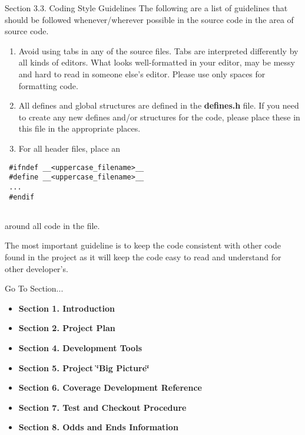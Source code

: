 \begin{Desc}
\item[Section 3.3. Coding Style Guidelines]The following are a list of guidelines that should be followed whenever/wherever possible in the source code in the area of source code.\end{Desc}
\begin{Desc}
\item[]\begin{enumerate}
\item Avoid using tabs in any of the source files. Tabs are interpreted differently by all kinds of editors. What looks well-formatted in your editor, may be messy and hard to read in someone else's editor. Please use only spaces for formatting code.\item All defines and global structures are defined in the {\bf defines.h} file. If you need to create any new defines and/or structures for the code, please place these in this file in the appropriate places.\item For all header files, place an\end{enumerate}
\end{Desc}


\footnotesize\begin{verbatim}
 #ifndef __<uppercase_filename>__
 #define __<uppercase_filename>__
 ...
 #endif
 
\end{verbatim}\normalsize


\begin{Desc}
\item[]around all code in the file.\end{Desc}
\begin{Desc}
\item[]The most important guideline is to keep the code consistent with other code found in the project as it will keep the code easy to read and understand for other developer's.\end{Desc}




\begin{Desc}
\item[Go To Section...]\begin{itemize}
\item {\bf Section 1.  Introduction} \item {\bf Section 2.  Project Plan} \item {\bf Section 4.  Development Tools} \item {\bf Section 5.  Project \char`\"{}Big Picture\char`\"{}} \item {\bf Section 6.  Coverage Development Reference} \item {\bf Section 7.  Test and Checkout Procedure} \item {\bf Section 8.  Odds and Ends Information} \end{itemize}
\end{Desc}
